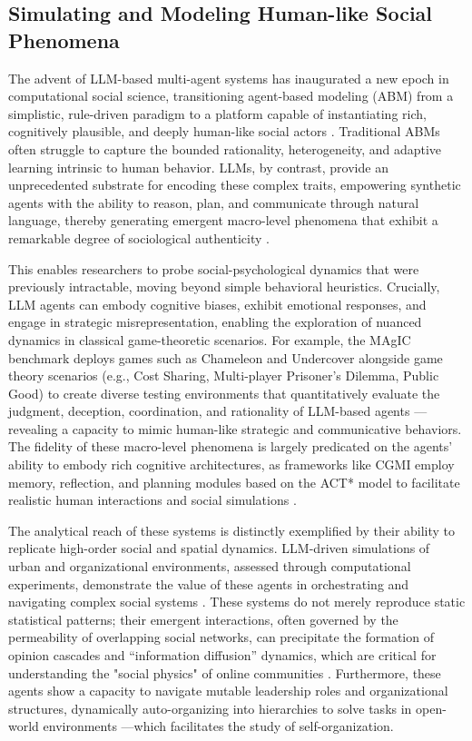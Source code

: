 \documentclass[11pt,a4paper]{article}
\begin{document}
\subsection{Simulating and Modeling Human-like Social Phenomena}


The advent of LLM-based multi-agent systems has inaugurated a new epoch in computational social science, transitioning agent-based modeling (ABM) from a simplistic, rule-driven paradigm to a platform capable of instantiating rich, cognitively plausible, and deeply human-like social actors \cite{arxiv:2402.00262v1}. Traditional ABMs often struggle to capture the bounded rationality, heterogeneity, and adaptive learning intrinsic to human behavior. LLMs, by contrast, provide an unprecedented substrate for encoding these complex traits, empowering synthetic agents with the ability to reason, plan, and communicate through natural language, thereby generating emergent macro-level phenomena that exhibit a remarkable degree of sociological authenticity \cite{arxiv:2210.06012v3,arxiv:2311.08562v2}.

This enables researchers to probe social-psychological dynamics that were previously intractable, moving beyond simple behavioral heuristics. Crucially, LLM agents can embody cognitive biases, exhibit emotional responses, and engage in strategic misrepresentation, enabling the exploration of nuanced dynamics in classical game-theoretic scenarios. For example, the MAgIC benchmark deploys games such as Chameleon and Undercover alongside game theory scenarios (e.g., Cost Sharing, Multi-player Prisoner's Dilemma, Public Good) to create diverse testing environments that quantitatively evaluate the judgment, deception, coordination, and rationality of LLM-based agents \cite{arxiv:2311.08562v2}---revealing a capacity to mimic human-like strategic and communicative behaviors. The fidelity of these macro-level phenomena is largely predicated on the agents' ability to embody rich cognitive architectures, as frameworks like CGMI employ memory, reflection, and planning modules based on the ACT* model to facilitate realistic human interactions and social simulations \cite{arxiv:2308.12503v2}.

The analytical reach of these systems is distinctly exemplified by their ability to replicate high-order social and spatial dynamics. LLM-driven simulations of urban and organizational environments, assessed through computational experiments, demonstrate the value of these agents in orchestrating and navigating complex social systems \cite{arxiv:2402.00262v1}. These systems do not merely reproduce static statistical patterns; their emergent interactions, often governed by the permeability of overlapping social networks, can precipitate the formation of opinion cascades and ``information diffusion'' dynamics, which are critical for understanding the "social physics" of online communities \cite{arxiv:1507.03826v1}. Furthermore, these agents show a capacity to navigate mutable leadership roles and organizational structures, dynamically auto-organizing into hierarchies to solve tasks in open-world environments \cite{arxiv:2403.08282v2}---which facilitates the study of self-organization.
\end{document}
